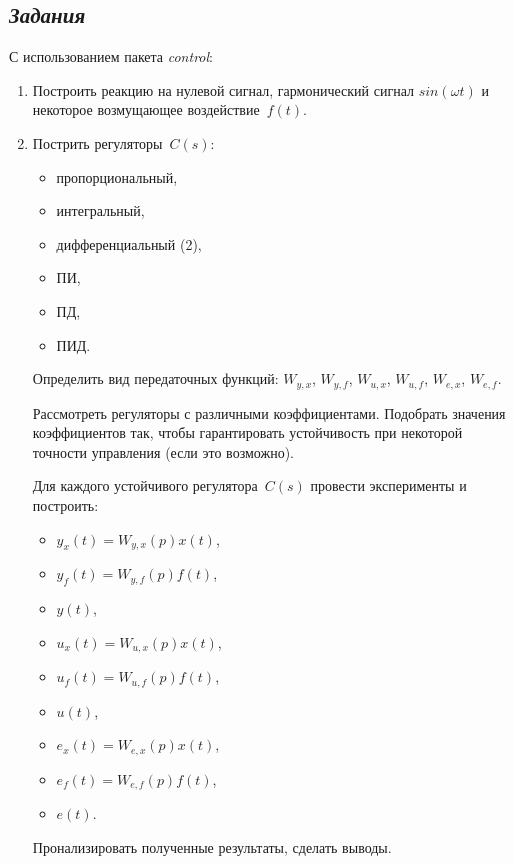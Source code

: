 \documentclass[a4paper,oneside,10pt]{book}
\theoremstyle{definition}
\begin{document}
\subsection*{\textit{Задания}}
С использованием пакета \textit{control}:
\begin{enumerate}
	\item
	      Построить реакцию на нулевой сигнал, гармонический сигнал $sin(\omega t)$ и некоторое возмущающее воздействие~$f(t)$.
	\item
	      Пострить регуляторы~$C(s)$:
	      \begin{itemize}
		      \item
		            пропорциональный,
		      \item
		            интегральный,
		      \item
		            дифференциальный (2),
		      \item
		            ПИ,
		      \item
		            ПД,
		      \item
		            ПИД.
	      \end{itemize}

	      Определить вид передаточных функций:
	      $W_{y,x}$, $W_{y,f}$,
	      $W_{u,x}$, $W_{u,f}$,
	      $W_{e,x}$, $W_{e,f}$.


	      Рассмотреть регуляторы с различными коэффициентами. Подобрать значения коэффициентов так, чтобы гарантировать устойчивость при некоторой точности управления (если это возможно).

	      Для каждого устойчивого регулятора~$C(s)$ провести эксперименты и построить:
	      \begin{itemize}
		      \item
		            $y_x(t) =  W_{y,x}(p)x(t)$,
		      \item
		            $y_f(t) =  W_{y,f}(p)f(t)$,
		      \item
		            $y(t)$,
		      \item
		            $u_x(t) =  W_{u,x}(p)x(t)$,
		      \item
		            $u_f(t) = W_{u,f}(p)f(t)$,
		      \item
		            $u(t)$,
		      \item
		            $e_x(t) =  W_{e,x}(p)x(t)$,
		      \item
		            $e_f(t) = W_{e,f}(p)f(t)$,
		      \item
		            $e(t)$.
	      \end{itemize}

	      Пронализировать полученные результаты, сделать выводы.
\end{enumerate}
\end{document}
